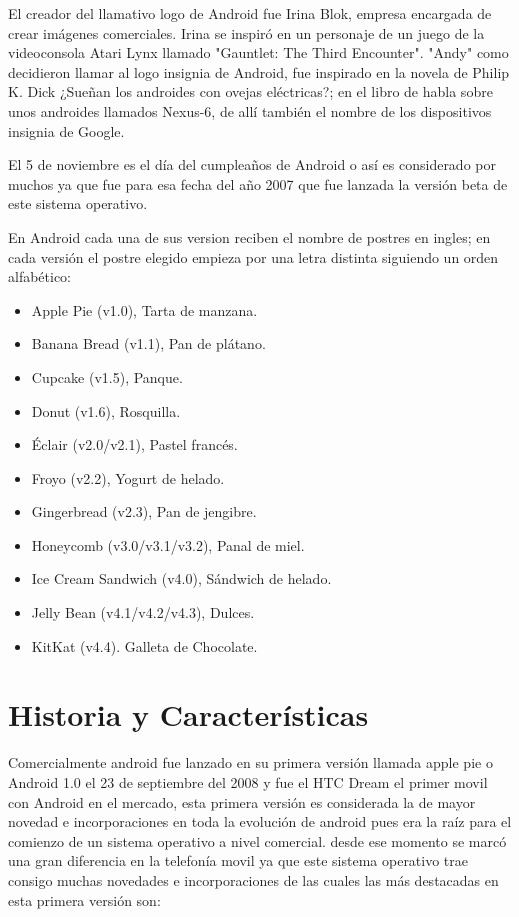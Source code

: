 El creador del llamativo logo de Android fue Irina Blok, empresa encargada de crear imágenes comerciales. Irina se inspiró en un personaje de un juego de la videoconsola 
Atari Lynx llamado "Gauntlet: The Third Encounter". "Andy" como decidieron llamar al logo insignia de Android, fue inspirado en la novela de Philip K. Dick ¿Sueñan los 
androides con ovejas eléctricas?; en el libro de habla sobre unos androides llamados Nexus-6, de allí también el nombre de los dispositivos insignia de Google.

El 5 de noviembre es el día del cumpleaños de Android o así es considerado por muchos ya que fue para esa fecha del año 2007 que fue lanzada la versión beta de este sistema 
operativo.

En Android cada una de sus version reciben el nombre de postres en ingles; en cada versión el postre elegido empieza por una letra distinta siguiendo un orden alfabético:

\begin{itemize}
	\item Apple Pie (v1.0), Tarta de manzana.
	\item Banana Bread (v1.1), Pan de plátano.
	\item Cupcake (v1.5), Panque.
	\item Donut (v1.6), Rosquilla.
	\item Éclair (v2.0/v2.1), Pastel francés.
	\item Froyo (v2.2), Yogurt de helado.
	\item Gingerbread (v2.3), Pan de jengibre.
	\item Honeycomb (v3.0/v3.1/v3.2), Panal de miel.
	\item Ice Cream Sandwich (v4.0), Sándwich de helado.
	\item Jelly Bean (v4.1/v4.2/v4.3), Dulces.
	\item KitKat (v4.4). Galleta de Chocolate.
\end{itemize}

\section*{Historia y Características}
Comercialmente android fue lanzado en su primera versión llamada apple pie o Android 1.0 el 23 de septiembre del 2008 y fue el HTC Dream el primer movil con Android en el 
mercado, esta primera versión es considerada la de mayor novedad e incorporaciones en toda la evolución de android pues era la raíz para el comienzo de un sistema operativo 
a nivel comercial. desde ese momento se marcó una gran diferencia en la telefonía movil ya que este sistema operativo trae consigo muchas novedades e incorporaciones de las 
cuales las más destacadas en esta primera versión son:

